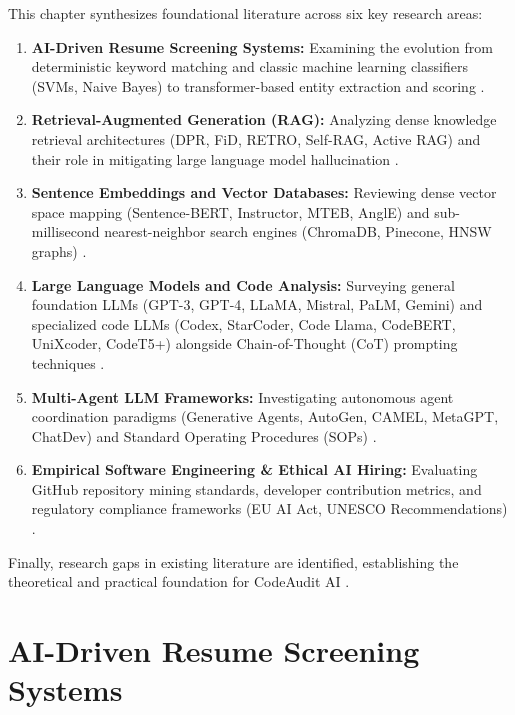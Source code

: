 This chapter synthesizes foundational literature across six key research areas:
\begin{enumerate}[leftmargin=*, label=\arabic*.]
    \item \textbf{AI-Driven Resume Screening Systems:} Examining the evolution from deterministic keyword matching and classic machine learning classifiers (SVMs, Naive Bayes) to transformer-based entity extraction and scoring \cite{ref1, ref9, ref11, ref7, ref8}.
    \item \textbf{Retrieval-Augmented Generation (RAG):} Analyzing dense knowledge retrieval architectures (DPR, FiD, RETRO, Self-RAG, Active RAG) and their role in mitigating large language model hallucination \cite{ref2, ref5, ref30, ref33, ref45, ref46}.
    \item \textbf{Sentence Embeddings and Vector Databases:} Reviewing dense vector space mapping (Sentence-BERT, Instructor, MTEB, AnglE) and sub-millisecond nearest-neighbor search engines (ChromaDB, Pinecone, HNSW graphs) \cite{ref31, ref32, ref47, ref34, ref41, ref48, ref49}.
    \item \textbf{Large Language Models and Code Analysis:} Surveying general foundation LLMs (GPT-3, GPT-4, LLaMA, Mistral, PaLM, Gemini) and specialized code LLMs (Codex, StarCoder, Code Llama, CodeBERT, UniXcoder, CodeT5+) alongside Chain-of-Thought (CoT) prompting techniques \cite{ref9, ref20, ref30, ref16, ref37, ref50, ref51, ref52, ref53, ref17, ref54, ref55, ref56, ref57, ref58, ref42, ref59, ref60}.
    \item \textbf{Multi-Agent LLM Frameworks:} Investigating autonomous agent coordination paradigms (Generative Agents, AutoGen, CAMEL, MetaGPT, ChatDev) and Standard Operating Procedures (SOPs) \cite{ref61, ref62, ref38, ref63, ref43, ref64, ref39}.
    \item \textbf{Empirical Software Engineering \& Ethical AI Hiring:} Evaluating GitHub repository mining standards, developer contribution metrics, and regulatory compliance frameworks (EU AI Act, UNESCO Recommendations) \cite{ref6, ref15, ref25, ref24, ref14, ref26, ref22, ref36, ref65, ref66}.
\end{enumerate}

Finally, research gaps in existing literature are identified, establishing the theoretical and practical foundation for CodeAudit AI \cite{ref20, ref23, ref8}.

\section{AI-Driven Resume Screening Systems}

